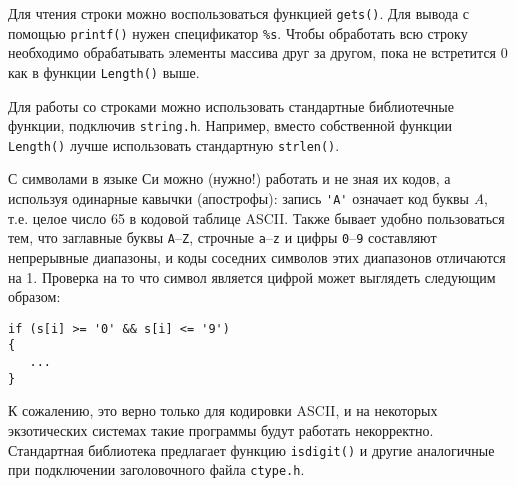 Для чтения строки можно воспользоваться функцией \texttt{gets()}. Для вывода
с помощью \texttt{printf()} нужен спецификатор \verb|%s|. Чтобы обработать
всю строку необходимо обрабатывать элементы массива друг за другом, пока не
встретится 0 как в функции \texttt{Length()} выше.

Для работы со строками можно использовать стандартные библиотечные функции,
подключив \texttt{string.h}. Например, вместо собственной функции
\texttt{Length()} лучше использовать стандартную \texttt{strlen()}.

С символами в языке Си можно (нужно!) работать и не зная их кодов, а используя
одинарные кавычки (апострофы): запись \verb|'A'| означает код буквы
\textit{A}, т.е. целое число 65 в кодовой таблице ASCII. Также бывает удобно
пользоваться тем, что заглавные буквы \texttt{A}--\texttt{Z}, строчные
\texttt{a}--\texttt{z} и цифры \texttt{0}--\texttt{9} составляют непрерывные
диапазоны, и коды соседних символов этих диапазонов отличаются на 1. Проверка
на то что символ является цифрой может выглядеть следующим образом:
%
\begin{verbatim}
if (s[i] >= '0' && s[i] <= '9')
{
   ...
}
\end{verbatim}

К сожалению, это верно только для кодировки ASCII, и на некоторых экзотических
системах такие программы будут работать некорректно. Стандартная библиотека
предлагает функцию \texttt{isdigit()} и другие аналогичные при подключении
заголовочного файла \texttt{ctype.h}.





